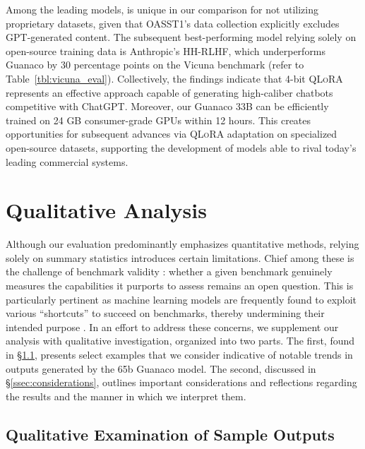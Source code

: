 Among the leading models, is unique in our comparison for not utilizing proprietary datasets, given that OASST1’s data collection explicitly excludes GPT-generated content. The subsequent best-performing model relying solely on open-source training data is Anthropic's HH-RLHF, which underperforms {Guanaco} by 30 percentage points on the Vicuna benchmark (refer to Table~\ref{tbl:vicuna_eval}). Collectively, the findings indicate that 4-bit \textsc{QLoRA} represents an effective approach capable of generating high-caliber chatbots competitive with ChatGPT. Moreover, our {Guanaco} 33B can be efficiently trained on 24 GB consumer-grade GPUs within 12 hours. This creates opportunities for subsequent advances via \textsc{QLoRA} adaptation on specialized open-source datasets, supporting the development of models able to rival today's leading commercial systems.

\section{Qualitative Analysis}

Although our evaluation predominantly emphasizes quantitative methods, relying solely on summary statistics introduces certain limitations. Chief among these is the challenge of benchmark validity \citep{liao2021we}: whether a given benchmark genuinely measures the capabilities it purports to assess remains an open question. This is particularly pertinent as machine learning models are frequently found to exploit various ``shortcuts'' to succeed on benchmarks, thereby undermining their intended purpose \citep{gururangan2018annotation, poliak2018hypothesis}. In an effort to address these concerns, we supplement our analysis with qualitative investigation, organized into two parts. The first, found in \S\ref{ssec:examples}, presents select examples that we consider indicative of notable trends in outputs generated by the 65b {Guanaco} model. The second, discussed in \S\ref{ssec:considerations}, outlines important considerations and reflections regarding the results and the manner in which we interpret them.

\subsection{Qualitative Examination of Sample Outputs}
\label{ssec:examples}

